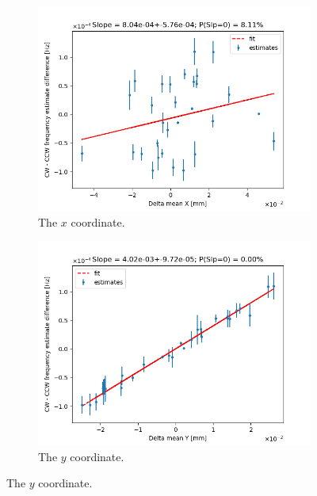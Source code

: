 \documentclass{article}
\begin{document}
\begin{figure}[!h]
  \centering
  \begin{subfigure}[b]{\linewidth}
    \includegraphics[width=\linewidth]{img/spin_axis_motion/multiple/freq_estimates_vs_centroid_diff_X}
    \caption{The $x$ coordinate.}
  \end{subfigure}
  \begin{subfigure}[b]{\linewidth}
    \includegraphics[width=\linewidth]{img/spin_axis_motion/multiple/freq_estimates_vs_centroid_diff_Y}
    \caption{The $y$ coordinate.}
  \end{subfigure}
\end{figure}
\end{document}
